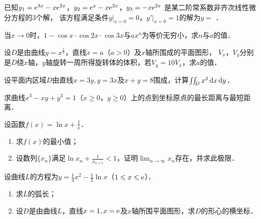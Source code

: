 \documentclass[plain,noanswer,medmath]{../../template/jnuexam}
\begin{document}
\begin{problem}
已知$y_1 = \mathrm{e}^{3x} - x\mathrm{e}^{2x}$，$y_2 = \mathrm{e}^x - x\mathrm{e}^{2x}$，$y_3 = - x\mathrm{e}^{2x}$
是某二阶常系数非齐次线性微分方程的$3$个解，
该方程满足条件$y\big|_{x = 0} = 0$，$y'\big|_{x = 0} = 1$的解为$y =$ \fillin{}．
\end{problem}






\begin{problem}[points=10]
当$x \to 0$时，$1 - \cos x \cdot \cos 2x \cdot \cos 3x$与$ax^n$为等价无穷小，求$n$与$a$的值．
\end{problem}


\begin{problem}[points=10]
设$D$是由曲线$y = x^{\frac{1}{3}}$，直线$x = a$（$a > 0$）及$x$轴所围成的平面图形，
$V_x$，$V_y$分别是$D$绕$x$轴，$y$轴旋转一周所得旋转体的体积，若$V_y = 10V_x$，求$a$的值．
\end{problem}


\begin{problem}[points=10]
设平面内区域$D$由直线$x = 3y,y = 3x$及$x + y = 8$围成，计算$\iint_D x^2 \mathop{}\!\mathrm{d} x\mathop{}\!\mathrm{d} y$．
\end{problem}




\begin{problem}[points=11]
求曲线$x^3 - xy + y^3 = 1$（$x \ge 0$，$y \ge 0$）上的点到坐标原点的最长距离与最短距离．
\end{problem}


\begin{problem}[points=11]
设函数$f(x) = \ln x + \frac{1}{x}$．
\begin{enumerate}
\item
求$f(x)$的最小值；
\item
设数列$\{x_n\}$满足$\ln x_n + \frac{1}{x_{n + 1}} < 1$，证明$\lim_{n \to \infty} x_n$存在，并求此极限．
\end{enumerate}
\end{problem}


\begin{problem}[points=11]
设曲线$L$的方程为$y = \frac{1}{4}x^2 - \frac{1}{2}\ln x$（$1 \leqslant x \leqslant \mathrm{e}$）．
\begin{enumerate}
\item 求$L$的弧长；
\item 设$D$是由曲线$L$，直线$x = 1,x = \mathrm{e}$及$x$轴所围平面图形，求$D$的形心的横坐标．
\end{enumerate}
\end{problem}




\end{document}
